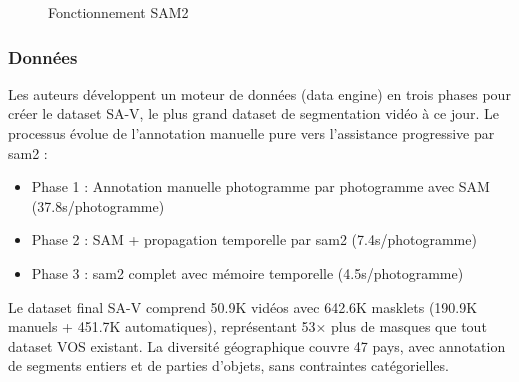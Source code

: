 \begin{figure}[H]
    \centering
   
    \begin{subfigure}{0.20\textwidth}
        \label{fig:ch2_sam2_pvs}
    \end{subfigure}
    \hfill
    \begin{subfigure}{0.25\textwidth}
        \label{fig:ch2_sam2_model}
    \end{subfigure}
    \hfill
    \begin{subfigure}{0.20\textwidth}
        \label{fig:ch2_sam2_data}
    \end{subfigure}
    
    \caption{Fonctionnement SAM2 \cite{ravi_sam_2024}}
    \label{fig:ch2_sam2_fonctionnement}
\end{figure}

\subsubsection{Données}
Les auteurs développent un moteur de données (data engine) en trois phases pour créer le dataset SA-V, le plus grand dataset de segmentation vidéo à ce jour. Le processus évolue de l'annotation manuelle pure vers l'assistance progressive par \acrshort{sam2} :
\begin{itemize}
    \item Phase 1 : Annotation manuelle photogramme par photogramme avec SAM (37.8s/photogramme)
    \item Phase 2 : SAM + propagation temporelle par \acrshort{sam2} (7.4s/photogramme)
    \item Phase 3 : \acrshort{sam2} complet avec mémoire temporelle (4.5s/photogramme)
\end{itemize}

Le dataset final SA-V comprend 50.9K vidéos avec 642.6K masklets (190.9K manuels + 451.7K automatiques), représentant 53× plus de masques que tout dataset VOS existant. La diversité géographique couvre 47 pays, avec annotation de segments entiers et de parties d'objets, sans contraintes catégorielles.

